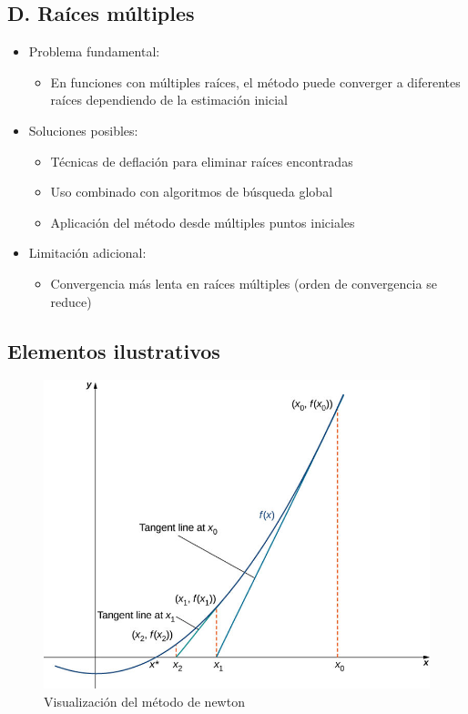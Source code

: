 \documentclass[conference]{IEEEtran}
\begin{document}
\subsection*{D. Raíces múltiples}
\begin{itemize}
    \item Problema fundamental:
    \begin{itemize}
        \item En funciones con múltiples raíces, el método puede converger a diferentes raíces dependiendo de la estimación inicial
    \end{itemize}
    \item Soluciones posibles:
    \begin{itemize}
        \item Técnicas de deflación para eliminar raíces encontradas
        \item Uso combinado con algoritmos de búsqueda global
        \item Aplicación del método desde múltiples puntos iniciales
    \end{itemize}
    \item Limitación adicional:
    \begin{itemize}
        \item Convergencia más lenta en raíces múltiples (orden de convergencia se reduce)
    \end{itemize}
\end{itemize}

\subsection{Elementos ilustrativos}
\begin{figure}[h]
    \centering
    \includegraphics[width=0.9\linewidth]{newton.jpg}
    \caption{Visualización del método de newton}
    \label{fig:Newton}
\end{figure}
\end{document}
